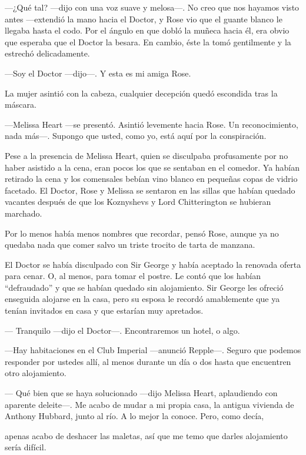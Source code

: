 {---¿Qué tal? ---dijo con una voz suave y melosa---. No creo que nos
	hayamos visto antes ---extendió la mano hacia el Doctor, y Rose vio que
	el guante blanco le llegaba hasta el codo. Por el ángulo en que dobló la
	muñeca hacia él, era obvio que esperaba que el Doctor la besara. En
cambio, éste la tomó gentilmente y la estrechó delicadamente.}

{---Soy el Doctor ---dijo---. Y esta es mi amiga Rose.}

{La mujer asintió con la cabeza, cualquier decepción quedó escondida
tras la máscara.}

{---Melissa Heart ---se presentó. Asintió levemente hacia Rose. Un
	reconocimiento, nada más---. Supongo que usted, como yo, está aquí por
la conspiración.}

\mbox{}

{Pese a la presencia de Melissa Heart, quien se disculpaba profusamente
	por no haber asistido a la cena, eran pocos los que se sentaban en el
	comedor. Ya habían retirado la cena y los comensales bebían vino blanco
	en pequeñas copas de vidrio facetado. El Doctor, Rose y Melissa se
	sentaron en las sillas que habían quedado vacantes después de que los
Koznyshevs y Lord Chitterington se hubieran marchado.}

{Por lo menos había menos nombres que recordar, pensó Rose, aunque ya no
quedaba nada que comer salvo un triste trocito de tarta de manzana.}

{El Doctor se había disculpado con Sir George y había aceptado la
	renovada oferta para cenar. O, al menos, para tomar el postre. Le contó
	que los habían ``defraudado'' y que se habían quedado sin alojamiento.
	Sir George les ofreció enseguida alojarse en la casa, pero su esposa le
	recordó amablemente que ya tenían invitados en casa y que estarían muy
apretados.}

{--- Tranquilo ---dijo el Doctor---. Encontraremos un hotel, o algo.}

{---Hay habitaciones en el Club Imperial ---anunció Repple---. Seguro
	que podemos responder por ustedes allí, al menos durante un día o dos
hasta que encuentren otro alojamiento.}

{--- Qué bien que se haya solucionado ---dijo Melissa Heart, aplaudiendo
	con aparente deleite---. Me acabo de mudar a mi propia casa, la antigua
	vivienda de Anthony Hubbard, junto al río. A lo mejor la conoce. Pero,
como decía,}

{apenas acabo de deshacer las maletas, así que me temo que darles
alojamiento sería difícil.}

